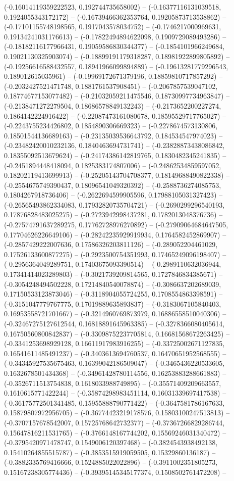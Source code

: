 (-0.16014119359222523, 0.192744735658002) -- (-0.16377116131039518, 0.1924055343172172) -- (-0.16739466362353764, 0.19205873713538862) -- (-0.17101155748198565, 0.1917043578034752) -- (-0.1746217000969631, 0.19134241031176613) -- (-0.17822494894622098, 0.1909729089493286) -- (-0.18182116177966431, 0.19059586830344377) -- (-0.1854101966249684, 0.19021130325903074) -- (-0.18899191179318287, 0.18981922899805892) -- (-0.19256616588432557, 0.18941966099894889) -- (-0.19613281779296543, 0.189012615035961) -- (-0.19969172671379196, 0.18859810717857292) -- (-0.2032427521471748, 0.1881761537908451) -- (-0.2067857539047102, 0.18774677153077482) -- (-0.21032059211475546, 0.18730997734963847) -- (-0.2138471272279504, 0.18686578849132243) -- (-0.2173652200227274, 0.1864142224916422) -- (-0.22087473161080678, 0.18595529717765027) -- (-0.2243755234426802, 0.1854890306669323) -- (-0.2278674573130806, 0.18501544136689163) -- (-0.23135039536643792, 0.184534547974023) -- (-0.23482420010232136, 0.1840463694731741) -- (-0.23828873438086842, 0.18355092513679624) -- (-0.24174386142819765, 0.1830482345241835) -- (-0.2451894448418094, 0.1825383174807006) -- (-0.24862534859597052, 0.18202119413699913) -- (-0.25205143704708377, 0.18149688490822338) -- (-0.2554675749390437, 0.18096541049320392) -- (-0.2588736274085753, 0.1804267918736406) -- (-0.2622694599905596, 0.17988105031327423) -- (-0.26565493862334083, 0.17932820735704721) -- (-0.2690299296540193, 0.17876828483025275) -- (-0.2723942998437281, 0.1782013048376736) -- (-0.27574791637289275, 0.17762728976270892) -- (-0.27909064684647505, 0.17704626226649106) -- (-0.28242235929919934, 0.1764582452869907) -- (-0.2857429222007636, 0.17586326203811126) -- (-0.289052204461029, 0.17526133600877275) -- (-0.2923500754351993, 0.17465249096198407) -- (-0.2956364049289751, 0.17403675093390514) -- (-0.2989110632036944, 0.17341414023289803) -- (-0.3021739209814565, 0.1727846834385671) -- (-0.3054248494502228, 0.17214840540078874) -- (-0.3086637202689039, 0.17150533123873046) -- (-0.3118904055724255, 0.1708554863398591) -- (-0.3151047779767775, 0.17019889635893837) -- (-0.3183067105840403, 0.16953558721701667) -- (-0.3214960769873979, 0.16886558510040306) -- (-0.32467275127612544, 0.16818891645963385) -- (-0.3278366080405614, 0.16750560800842837) -- (-0.33098752237705814, 0.16681568672263425) -- (-0.3341253698929128, 0.16611917983916255) -- (-0.33725002671127835, 0.16541611485491237) -- (-0.3403613694760537, 0.16470651952568555) -- (-0.34345927535675463, 0.16399042186509047) -- (-0.3465436220533605, 0.1632678501434368) -- (-0.34961428780114556, 0.16253883288661883) -- (-0.3526711513754838, 0.1618033988749895) -- (-0.35571409209663557, 0.1610615771422244) -- (-0.35874298983451114, 0.16031339697417538) -- (-0.36175772501341485, 0.15955888790771422) -- (-0.3647581786167633, 0.15879807972956705) -- (-0.36774423219178576, 0.15803100247513813) -- (-0.3707157678542007, 0.15725768642732377) -- (-0.37367266829286744, 0.15647816211531765) -- (-0.3766148167744202, 0.15569246031340472) -- (-0.3795420971478747, 0.1549006120397468) -- (-0.3824543938492138, 0.15410264855515787) -- (-0.3853515919059505, 0.15329860136187) -- (-0.3882335769416666, 0.1524885022022896) -- (-0.3911002351805273, 0.15167238305774436) -- (-0.39395145345177374, 0.1508502761472208) -- 